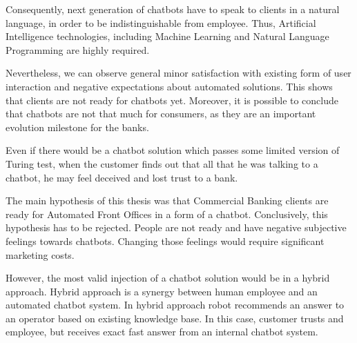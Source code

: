 Consequently, next generation of chatbots have to speak to clients in a natural language, in order to be indistinguishable from employee.
Thus, Artificial Intelligence technologies, including Machine Learning and Natural Language Programming are highly required.

Nevertheless, we can observe general minor satisfaction with existing form of user interaction and negative expectations about automated solutions.
This shows that clients are not ready for chatbots yet.
Moreover, it is possible to conclude that chatbots are not that much for consumers, as they are an important evolution milestone for the banks.

Even if there would be a chatbot solution which passes some limited version of Turing test, when the customer finds
out that all that he was talking to a chatbot, he may feel deceived and lost trust to a bank.

The main hypothesis of this thesis was that Commercial Banking clients are ready for Automated Front Offices in a form of a chatbot.
Conclusively, this hypothesis has to be rejected.
People are not ready and have negative subjective feelings towards chatbots.
Changing those feelings would require significant marketing costs.

However, the most valid injection of a chatbot solution would be in a hybrid approach.
Hybrid approach is a synergy between human employee and an automated chatbot system.
In hybrid approach robot recommends an answer to an operator based on existing knowledge base.
In this case, customer trusts and employee, but receives exact fast answer from an internal chatbot system.